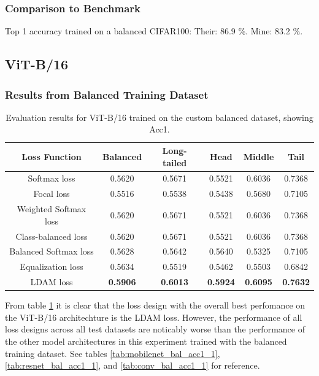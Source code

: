 \subsubsection{Comparison to Benchmark}

Top 1 accuracy trained on a balanced CIFAR100:
Their: 86.9 \%.
Mine: 83.2 \%.


\subsection{ViT-B/16}

\subsubsection{Results from Balanced Training Dataset}

\begin{table}[H]
    \centering
    \caption{Evaluation results for ViT-B/16 trained on the custom balanced dataset, showing Acc1.}
    \begin{tabular}{cccccc}
        \toprule
        Loss Function & Balanced & Long-tailed & Head & Middle & Tail \\ 
        \midrule
        Softmax loss   & 0.5620 & 0.5671 & 0.5521 & 0.6036 & 0.7368 \\
        Focal loss   & 0.5516 & 0.5538 & 0.5438 & 0.5680 & 0.7105 \\
        Weighted Softmax loss   & 0.5620 & 0.5671 & 0.5521 & 0.6036 & 0.7368 \\
        Class-balanced loss   & 0.5620 & 0.5671 &  0.5521 & 0.6036 & 0.7368 \\
        Balanced Softmax loss   & 0.5628 & 0.5642 & 0.5640 & 0.5325 & 0.7105 \\
        Equalization loss   & 0.5634   & 0.5519 & 0.5462 & 0.5503 & 0.6842 \\
        LDAM loss   & \textbf{0.5906} &  \textbf{0.6013} & \textbf{0.5924} & \textbf{0.6095} & \textbf{0.7632} \\
        \bottomrule
    \end{tabular}
    \label{tab:vit_bal_acc1_1}
\end{table}

From table \ref{tab:vit_bal_acc1_1} it is clear that the loss design with the overall best perfomance on the ViT-B/16 architechture is the LDAM loss. However, the performance of all loss designs across all test datasets are noticably worse than the performance of the other model architectures in this experiment trained with the balanced training dataset. See tables \ref{tab:mobilenet_bal_acc1_1}, \ref{tab:resnet_bal_acc1_1}, and \ref{tab:conv_bal_acc1_1} for reference.  

